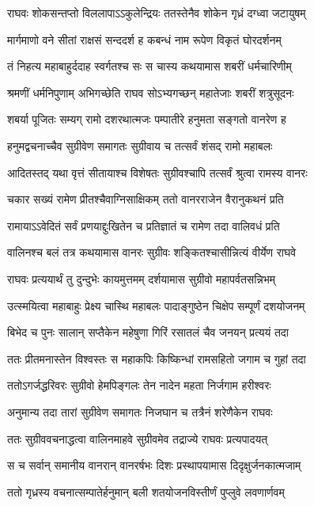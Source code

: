 \twolineshloka
{राघवः शोकसन्तप्तो विललापाऽऽकुलेन्द्रियः}
{ततस्तेनैव शोकेन गृध्रं दग्ध्वा जटायुषम्}%

\twolineshloka
{मार्गमाणो वने सीतां राक्षसं सन्ददर्श ह}
{कबन्धं नाम रूपेण विकृतं घोरदर्शनम्}%

\twolineshloka
{तं निहत्य महाबाहुर्ददाह स्वर्गतश्च सः}
{स चास्य कथयामास शबरीं धर्मचारिणीम्}%

\twolineshloka
{श्रमणीं धर्मनिपुणाम् अभिगच्छेति राघव}
{सोऽभ्यगच्छन् महातेजाः शबरीं शत्रुसूदनः}%

\twolineshloka
{शबर्या पूजितः सम्यग् रामो दशरथात्मजः}
{पम्पातीरे हनुमता सङ्गतो वानरेण ह}%

\twolineshloka
{हनुमद्वचनाच्चैव सुग्रीवेण समागतः}
{सुग्रीवाय च तत्सर्वं शंसद् रामो महाबलः}%

\twolineshloka
{आदितस्तद् यथा वृत्तं सीतायाश्च विशेषतः}
{सुग्रीवश्चापि तत्सर्वं श्रुत्वा रामस्य वानरः}%

\twolineshloka
{चकार सख्यं रामेण प्रीतश्चैवाग्निसाक्षिकम्}
{ततो वानरराजेन वैरानुकथनं प्रति}%

\twolineshloka
{रामायाऽऽवेदितं सर्वं प्रणयाद्दुःखितेन च}
{प्रतिज्ञातं च रामेण तदा वालिवधं प्रति}%

\twolineshloka
{वालिनश्च बलं तत्र कथयामास वानरः}
{सुग्रीवः शङ्कितश्चासीन्नित्यं वीर्येण राघवे}%

\twolineshloka
{राघवः प्रत्ययार्थं तु दुन्दुभेः कायमुत्तमम्}
{दर्शयामास सुग्रीवो महापर्वतसन्निभम्}%

\twolineshloka
{उत्स्मयित्वा महाबाहुः प्रेक्ष्य चास्थि महाबलः}
{पादाङ्गुष्ठेन चिक्षेप सम्पूर्णं दशयोजनम्}%

\twolineshloka
{बिभेद च पुनः सालान् सप्तैकेन महेषुणा}
{गिरिं रसातलं चैव जनयन् प्रत्ययं तदा}%

\twolineshloka
{ततः प्रीतमनास्तेन विश्वस्तः स महाकपिः}
{किष्किन्धां रामसहितो जगाम च गुहां तदा}%

\twolineshloka
{ततोऽगर्जद्धरिवरः सुग्रीवो हेमपिङ्गलः}
{तेन नादेन महता निर्जगाम हरीश्वरः}%

\twolineshloka
{अनुमान्य तदा तारां सुग्रीवेण समागतः}
{निजघान च तत्रैनं शरेणैकेन राघवः}%

\twolineshloka
{ततः सुग्रीववचनाद्धत्वा वालिनमाहवे}
{सुग्रीवमेव तद्राज्ये राघवः प्रत्यपादयत्}%

\twolineshloka
{स च सर्वान् समानीय वानरान् वानरर्षभः}
{दिशः प्रस्थापयामास दिदृक्षुर्जनकात्मजाम्}%

\twolineshloka
{ततो गृध्रस्य वचनात्सम्पातेर्हनुमान् बली}
{शतयोजनविस्तीर्णं पुप्लुवे लवणार्णवम्}%

